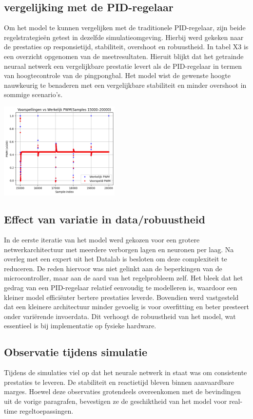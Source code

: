 \subsection{vergelijking met de PID-regelaar}
Om het model te kunnen vergelijken met de traditionele PID-regelaar, zijn beide regelstrategieën getest in dezelfde simulatieomgeving. Hierbij werd gekeken naar de prestaties op responsietijd, stabiliteit, overshoot en robuustheid. In tabel X3 is een overzicht opgenomen van de meetresultaten. Hieruit blijkt dat het getrainde neuraal netwerk een vergelijkbare prestatie levert als de PID-regelaar in termen van hoogtecontrole van de pingpongbal. Het model wist de gewenste hoogte nauwkeurig te benaderen met een vergelijkbare stabiliteit en minder overshoot in sommige scenario’s.

\begin{center}
\centering
\includegraphics[width=0.45\textwidth]{./afbeeldingen/vergelijking.png}
\label{fig:vergelijking met PID}
\end{center}


\subsection{Effect van variatie in data/robuustheid}
In de eerste iteratie van het model werd gekozen voor een grotere netwerkarchitectuur met meerdere verborgen lagen en neuronen per laag. Na overleg met een expert uit het Datalab is besloten om deze complexiteit te reduceren. De reden hiervoor was niet gelinkt aan de beperkingen van de microcontroller, maar aan de aard van het regelprobleem zelf. Het bleek dat het gedrag van een PID-regelaar relatief eenvoudig te modelleren is, waardoor een kleiner model efficiënter bertere prestaties leverde.
Bovendien werd vastgesteld dat een kleinere architectuur minder gevoelig is voor overfitting en beter presteert onder variërende invoerdata. Dit verhoogt de robuustheid van het model, wat essentieel is bij implementatie op fysieke hardware.

\subsection{Observatie tijdens simulatie}
Tijdens de simulaties viel op dat het neurale netwerk in staat was om consistente prestaties te leveren. De stabiliteit en reactietijd bleven binnen aanvaardbare marges. Hoewel deze observaties grotendeels overeenkomen met de bevindingen uit de vorige paragrafen, bevestigen ze de geschiktheid van het model voor real-time regeltoepassingen.



